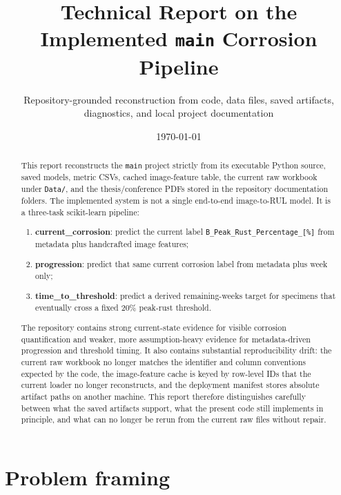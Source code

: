 \documentclass[11pt]{article}
\title{Technical Report on the Implemented \texttt{main} Corrosion Pipeline}
\author{Repository-grounded reconstruction from code, data files, saved artifacts, diagnostics, and local project documentation}
\date{\today}
\begin{document}
\maketitle

\begin{abstract}
This report reconstructs the \texttt{main} project strictly from its executable Python source, saved models, metric CSVs, cached image-feature table, the current raw workbook under \texttt{Data/}, and the thesis/conference PDFs stored in the repository documentation folders. The implemented system is not a single end-to-end image-to-RUL model. It is a three-task scikit-learn pipeline:
\begin{enumerate}
  \item \textbf{current\_corrosion}: predict the current label \texttt{B\_Peak\_Rust\_Percentage\_[\%]} from metadata plus handcrafted image features;
  \item \textbf{progression}: predict that same current corrosion label from metadata plus week only;
  \item \textbf{time\_to\_threshold}: predict a derived remaining-weeks target for specimens that eventually cross a fixed 20\% peak-rust threshold.
\end{enumerate}

The repository contains strong current-state evidence for visible corrosion quantification and weaker, more assumption-heavy evidence for metadata-driven progression and threshold timing. It also contains substantial reproducibility drift: the current raw workbook no longer matches the identifier and column conventions expected by the code, the image-feature cache is keyed by row-level IDs that the current loader no longer reconstructs, and the deployment manifest stores absolute artifact paths on another machine. This report therefore distinguishes carefully between what the saved artifacts support, what the present code still implements in principle, and what can no longer be rerun from the current raw files without repair.
\end{abstract}

\tableofcontents
\clearpage

\section{Problem framing}
\end{document}
